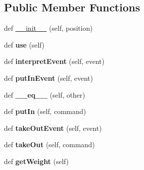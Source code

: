 \subsection*{Public Member Functions}
\begin{DoxyCompactItemize}
\item 
def \hyperlink{classcontainers_1_1_container_a5e4d55a37e88771485d55dda31a9b706}{\+\_\+\+\_\+init\+\_\+\+\_\+} (self, position)
\item 
\hypertarget{classcontainers_1_1_container_a43cb2c742fa241a9d146085b6002d386}{}def {\bfseries use} (self)\label{classcontainers_1_1_container_a43cb2c742fa241a9d146085b6002d386}

\item 
\hypertarget{classcontainers_1_1_container_aea1d643243b31a5bed3863f34e817ab5}{}def {\bfseries interpret\+Event} (self, event)\label{classcontainers_1_1_container_aea1d643243b31a5bed3863f34e817ab5}

\item 
\hypertarget{classcontainers_1_1_container_a21a0f70f89bd0e6d83b62735c03ce9bd}{}def {\bfseries put\+In\+Event} (self, event)\label{classcontainers_1_1_container_a21a0f70f89bd0e6d83b62735c03ce9bd}

\item 
\hypertarget{classcontainers_1_1_container_af4d5033e451d9b8eea84a9bda434fa6a}{}def {\bfseries \+\_\+\+\_\+eq\+\_\+\+\_\+} (self, other)\label{classcontainers_1_1_container_af4d5033e451d9b8eea84a9bda434fa6a}

\item 
\hypertarget{classcontainers_1_1_container_a2b35d9a9a191728e481201ba972ccdec}{}def {\bfseries put\+In} (self, command)\label{classcontainers_1_1_container_a2b35d9a9a191728e481201ba972ccdec}

\item 
\hypertarget{classcontainers_1_1_container_ac0364305e030d8d34693c67e515e2357}{}def {\bfseries take\+Out\+Event} (self, event)\label{classcontainers_1_1_container_ac0364305e030d8d34693c67e515e2357}

\item 
\hypertarget{classcontainers_1_1_container_a8c3afeb945a88170a3ca0a6ad4e05424}{}def {\bfseries take\+Out} (self, command)\label{classcontainers_1_1_container_a8c3afeb945a88170a3ca0a6ad4e05424}

\item 
\hypertarget{classcontainers_1_1_container_ab2f40abfabc93db1871bd916bfbea0ba}{}def {\bfseries get\+Weight} (self)\label{classcontainers_1_1_container_ab2f40abfabc93db1871bd916bfbea0ba}

\end{DoxyCompactItemize}
